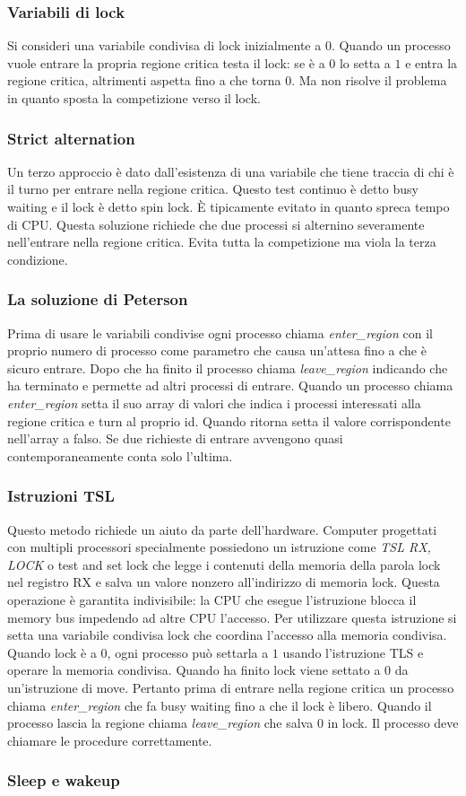 \subsubsection{Variabili di lock}
Si consideri una variabile condivisa di lock inizialmente a $0$. Quando un processo vuole entrare la propria regione critica testa il lock: se \`e a $0$ lo setta a $1$ e entra la 
regione critica, altrimenti aspetta fino a che torna $0$. Ma non risolve il problema in quanto sposta la competizione verso il lock.
\subsubsection{Strict alternation}
Un terzo approccio \`e dato dall'esistenza di una variabile che tiene traccia di chi \`e il turno per entrare nella regione critica. Questo test continuo \`e detto busy waiting e il 
lock \`e detto spin lock. \`E tipicamente evitato in quanto spreca tempo di CPU. Questa soluzione richiede che due processi si alternino severamente nell'entrare nella regione critica. 
Evita tutta la competizione ma viola la terza condizione.
\subsubsection{La soluzione di Peterson}
Prima di usare le variabili condivise ogni processo chiama \emph{enter\_region} con il proprio numero di processo come parametro che causa un'attesa fino a che \`e sicuro entrare. Dopo
che ha finito il processo chiama \emph{leave\_region} indicando che ha terminato e permette ad altri processi di entrare. Quando un processo chiama \emph{enter\_region} setta il suo
array di valori che indica i processi interessati alla regione critica e turn al proprio id. Quando ritorna setta il valore corrispondente nell'array a falso. Se due richieste di entrare
avvengono quasi contemporaneamente conta solo l'ultima. 
\subsubsection{Istruzioni TSL}
Questo metodo richiede un aiuto da parte dell'hardware. Computer progettati con multipli processori specialmente possiedono un istruzione come \emph{TSL RX, LOCK} o test and set lock
che legge i contenuti della memoria della parola lock nel registro RX e salva un valore nonzero all'indirizzo di memoria lock. Questa operazione \`e garantita indivisibile: la CPU che
esegue l'istruzione blocca il memory bus impedendo ad altre CPU l'accesso. Per utilizzare questa istruzione si setta una variabile condivisa lock che coordina l'accesso alla memoria
condivisa. Quando lock \`e a $0$, ogni processo pu\`o settarla a $1$ usando l'istruzione TLS e operare la memoria condivisa. Quando ha finito lock viene settato a $0$ da un'istruzione
di move. Pertanto prima di entrare nella regione critica un processo chiama \emph{enter\_region} che fa busy waiting fino a che il lock \`e libero. Quando il processo lascia la regione
chiama \emph{leave\_region} che salva $0$ in lock. Il processo deve chiamare le procedure correttamente.
\subsubsection{Sleep e wakeup}
